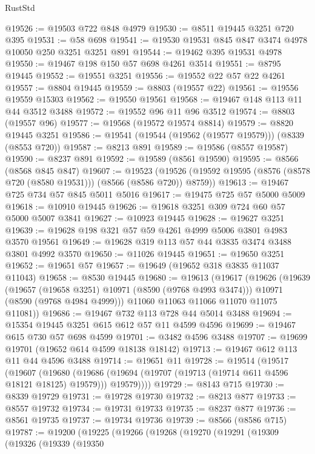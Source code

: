 \begin{lexlean}{RustStd}
\begin{coremodule}
@19526 := @19503 @722 @848 @4979
@19530 := @8511 @19445 @3251 @720 @395
@19531 := @58 @698
@19541 := @19530 @19531 @845 @847 @3474 @4978 @10050 @250 @3251 @3251 @891
@19544 := @19462 @395 @19531 @4978
@19550 := @19467 @198 @150 @57 @698 @4261 @3514
@19551 := @8795 @19445
@19552 := @19551 @3251
@19556 := @19552 @22 @57 @22 @4261
@19557 := @8804 @19445
@19559 := @8803 (@19557 @22)
@19561 := @19556 @19559 @15303
@19562 := @19550 @19561
@19568 := @19467 @148 @113 @11 @44 @3512 @3488
@19572 := @19552 @96 @11 @96 @3512
@19574 := @8803 (@19557 @96)
@19577 := @19568 (@19572 @19574 @8814)
@19579 := @8820 @19445 @3251
@19586 := @19541 (@19544 (@19562 (@19577 @19579))) (@8339 (@8553 @720))
@19587 := @8213 @891
@19589 := @19586 (@8557 @19587)
@19590 := @8237 @891
@19592 := @19589 (@8561 @19590)
@19595 := @8566 (@8568 @845 @847)
@19607 := @19523
    (@19526 (@19592 @19595 (@8576 (@8578 @720 (@8580 @19531))) (@8566 (@8586 @720)) @8759))
@19613 := @19467 @725 @734 @57 @845 @5011 @5016
@19617 := @19475 @725 @57 @5000 @5009
@19618 := @10910 @19445
@19626 := @19618 @3251 @309 @724 @60 @57 @5000 @5007 @3841
@19627 := @10923 @19445
@19628 := @19627 @3251
@19639 := @19628 @198 @321 @57 @59 @4261 @4999 @5006 @3801 @4983 @3570 @19561
@19649 := @19628 @319 @113 @57 @44 @3835 @3474 @3488 @3801 @4992 @3570
@19650 := @11026 @19445
@19651 := @19650 @3251
@19652 := @19651 @57
@19657 := @19649 (@19652 @318 @3835 @11037 @11043)
@19658 := @8530 @19445
@19680 := @19613
    (@19617
      (@19626
        (@19639
          (@19657 (@19658 @3251) @10971 (@8590 (@9768 @4993 @3474)))
          @10971
          (@8590 (@9768 @4984 @4999)))
        @11060
        @11063
        @11066
        @11070
        @11075
        @11081))
@19686 := @19467 @732 @113 @728 @44 @5014 @3488
@19694 := @15354 @19445 @3251 @615 @612 @57 @11 @4599 @4596
@19699 := @19467 @615 @730 @57 @698 @4599
@19701 := @3482 @4596 @3488
@19707 := @19699 @19701 (@19652 @614 @4599 @18138 @18142)
@19713 := @19467 @612 @113 @11 @44 @4596 @3488
@19714 := @19651 @11
@19728 := @19514
    (@19517
      (@19607
        (@19680
          (@19686 (@19694 (@19707 (@19713 (@19714 @611 @4596 @18121 @18125) @19579))) @19579))))
@19729 := @8143 @715
@19730 := @8339 @19729
@19731 := @19728 @19730
@19732 := @8213 @877
@19733 := @8557 @19732
@19734 := @19731 @19733
@19735 := @8237 @877
@19736 := @8561 @19735
@19737 := @19734 @19736
@19739 := @8566 (@8586 @715)
@19787 := @19200
    (@19225
      (@19266
        (@19268
          (@19270
            (@19291
              (@19309
                (@19326
                  (@19339
                    (@19350

\end{coremodule}
\end{lexlean}
